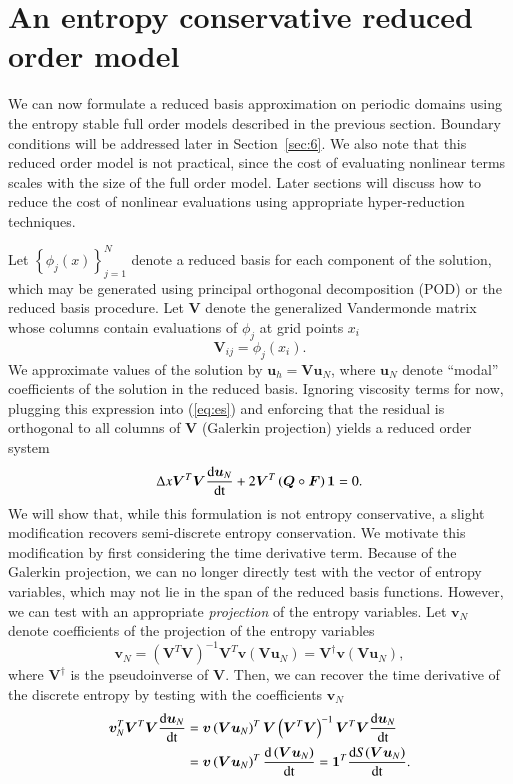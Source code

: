 \documentclass[preprint,10pt]{elsarticle}
\theoremstyle{definition}
\theoremstyle{lemma}
\theoremstyle{theorem}
\theoremstyle{assumption}
\newcommand{\td}[2]{\frac{{\rm d}#1}{{\rm d}{\rm #2}}}
\newcommand{\LRp}[1]{\left( #1 \right)}
\newcommand{\LRc}[1]{\left\{ #1 \right\}}
\begin{document}
\section{An entropy conservative reduced order model}
\label{sec:3}
We can now formulate a reduced basis approximation on periodic domains using the entropy stable full order models described in the previous section.  Boundary conditions will be addressed later in Section~\ref{sec:6}.  We also note that this reduced order model is not practical, since the cost of evaluating nonlinear terms scales with the size of the full order model.  Later sections will discuss how to reduce the cost of nonlinear evaluations using appropriate hyper-reduction techniques.

Let $\LRc{{\phi}_j(x)}_{j=1}^{N}$ denote a reduced basis for each component of the solution, which may be generated using principal orthogonal decomposition (POD) or the reduced basis procedure.  Let $\bm{V}$ denote the generalized Vandermonde matrix whose columns contain evaluations of $\phi_j$ at grid points $x_i$
\[
\bm{V}_{ij} = {\phi}_j(x_i).
\]
We approximate values of the solution by $\bm{u}_h = \bm{V}\bm{u}_N$, where $\bm{u}_N$ denote ``modal'' coefficients  of the solution in the reduced basis.  Ignoring viscosity terms for now, plugging this expression into (\ref{eq:es}) and enforcing that the residual is orthogonal to all columns of $\bm{V}$ (Galerkin projection) yields a reduced order system
\begin{align*}
\Delta x\bm{V}^T\bm{V}\td{\bm{u}_N}{t} + 2\bm{V}^T\LRp{\bm{Q}\circ \bm{F}}\bm{1} = 0.
\end{align*}
We will show that, while this formulation is not entropy conservative, a slight modification recovers semi-discrete entropy conservation.  We motivate this modification by first considering the time derivative term.  Because of the Galerkin projection, we can no longer directly test with the vector of entropy variables, which may not lie  in the span of the reduced basis functions.  However, we can test with an appropriate \textit{projection} of the entropy variables.  Let $\bm{v}_N$ denote coefficients of the projection of the entropy variables
\[
\bm{v}_N = \LRp{\bm{V}^T\bm{V}}^{-1}\bm{V}^T \bm{v}\LRp{\bm{V}\bm{u}_N} = \bm{V}^{\dagger} \bm{v}\LRp{\bm{V}\bm{u}_N},
\]
where $\bm{V}^{\dagger}$ is the pseudoinverse of $\bm{V}$.  Then, we can recover the time derivative of the discrete entropy by testing with the coefficients $\bm{v}_N$
\begin{align}
\bm{v}_N^T\bm{V}^T\bm{V}\td{\bm{u}_N}{t} &= \bm{v}\LRp{\bm{V}\bm{u}_N}^T \bm{V}\LRp{\bm{V}^T\bm{V}}^{-1}\bm{V}^T\bm{V} \td{\bm{u}_N}{t} \label{eq:esromtime}\\
&= 
 \bm{v}\LRp{\bm{V}\bm{u}_N}^T \td{\LRp{\bm{V}\bm{u}_N}}{t} = \bm{1}^T\td{S(\bm{V}\bm{u}_N)}{t}.\nonumber
\end{align}
\end{document}
